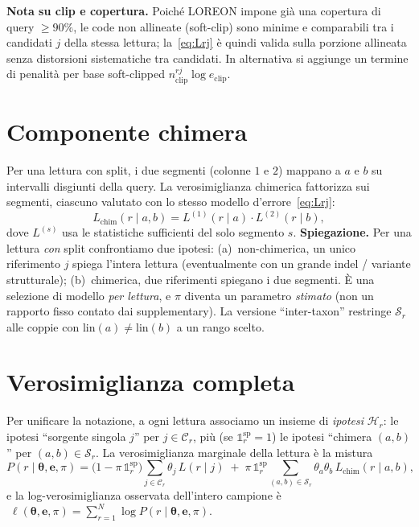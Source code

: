 \documentclass[11pt,a4paper]{article}
\newcommand{\bt}{\boldsymbol{\theta}}
\newcommand{\bpi}{\pi}
\newcommand{\ee}{\mathbf{e}}
\newcommand{\Cand}{\mathcal{C}}
\newcommand{\Hyp}{\mathcal{H}}
\newcommand{\Split}{\mathcal{S}}
\newcommand{\I}{\mathbb{1}}
\newcommand{\lin}{\mathrm{lin}}
\begin{document}
\medskip\noindent\textbf{Nota su clip e copertura.} Poich\'e LOREON impone gi\`a una copertura di query $\ge 90\%$, le code non allineate (soft-clip) sono minime e comparabili tra i candidati $j$ della stessa lettura; la~\eqref{eq:Lrj} \`e quindi valida sulla porzione allineata senza distorsioni sistematiche tra candidati. In alternativa si aggiunge un termine di penalit\`a per base soft-clipped $n^{rj}_{\mathrm{clip}}\log e_{\mathrm{clip}}$.

\section{Componente chimera}\label{sec:chim}
Per una lettura con split, i due segmenti (colonne $1$ e $2$) mappano a $a$ e $b$ su intervalli disgiunti della query. La verosimiglianza chimerica fattorizza sui segmenti, ciascuno valutato con lo stesso modello d'errore~\eqref{eq:Lrj}:
\begin{equation}
L_{\mathrm{chim}}(r\mid a,b)=L^{(1)}(r\mid a)\cdot L^{(2)}(r\mid b),
\end{equation}
dove $L^{(s)}$ usa le statistiche sufficienti del solo segmento $s$. \textbf{Spiegazione.} Per una lettura \emph{con} split confrontiamo due ipotesi: (a)~non-chimerica, un unico riferimento $j$ spiega l'intera lettura (eventualmente con un grande indel / variante strutturale); (b)~chimerica, due riferimenti spiegano i due segmenti. \`E una selezione di modello \emph{per lettura}, e $\bpi$ diventa un parametro \emph{stimato} (non un rapporto fisso contato dai supplementary). La versione ``inter-taxon'' restringe $\Split_r$ alle coppie con $\lin(a)\ne\lin(b)$ a un rango scelto.

\section{Verosimiglianza completa}
Per unificare la notazione, a ogni lettura associamo un insieme di \emph{ipotesi} $\Hyp_r$: le ipotesi ``sorgente singola $j$'' per $j\in\Cand_r$, pi\`u (se $\I^{\mathrm{sp}}_r=1$) le ipotesi ``chimera $(a,b)$'' per $(a,b)\in\Split_r$. La verosimiglianza marginale della lettura \`e la mistura
\begin{equation}
P(r\mid\bt,\ee,\bpi)=\big(1-\bpi\,\I^{\mathrm{sp}}_r\big)\!\!\sum_{j\in\Cand_r}\!\!\theta_j\,L(r\mid j)\;+\;\bpi\,\I^{\mathrm{sp}}_r\!\!\sum_{(a,b)\in\Split_r}\!\!\theta_a\theta_b\,L_{\mathrm{chim}}(r\mid a,b),
\label{eq:Pr}
\end{equation}
e la log-verosimiglianza osservata dell'intero campione \`e $\;\ell(\bt,\ee,\bpi)=\sum_{r=1}^{N}\log P(r\mid\bt,\ee,\bpi).$
\end{document}
